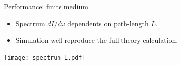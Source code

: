 \documentclass[11pt]{beamer}
\begin{document}
\begin{frame}{Performance: finite medium}
\begin{itemize}
\item Spectrum $dI/d\omega$ dependents on path-length $L$.
\item Simulation well reproduce the full theory calculation.
\end{itemize}
\begin{center}
\texttt{[image: spectrum\_L.pdf]}
\end{center}
\end{frame}
\end{document}
